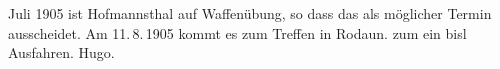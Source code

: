 \begin{ledgroupsized}[t]{13cm}
{{{                     Juli 1905 ist Hofmannsthal
                  auf Waffenübung, so dass das als möglicher Termin ausscheidet. Am 11. 8. 1905 kommt es
                  zum Treffen in Rodaun.}}}\label{K_L01541-1h} zum ein bisl
               Ausfahren.\pend
           \pstart \spacefill\mbox{Hugo.}\pend{}
         
         \endnumbering{}\end{ledgroupsized}  \newcommand{\dateiname}{L01541}\newcommand{\titel}{Hugo von Hofmannsthal an Arthur Schnitzler, 11. [8.?] 1905}\newcommand{\editorInnen}{Martin Anton Müller und Gerd-Hermann Susen}
      
